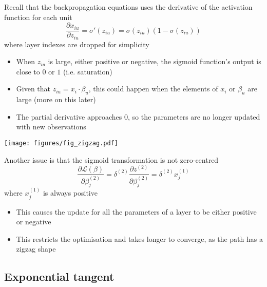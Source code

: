 \documentclass[c]{beamer}
\begin{document}
\begin{frame}{\secsubname}
	Recall that the backpropagation equations uses the derivative of the activation function for each unit
	\begin{equation*}
		\frac{\partial x_{iu}}{\partial z_{iu}} = \sigma'\left({z_{iu}}\right) = \sigma(z_{iu}) \left(1 - \sigma(z_{iu})\right)
	\end{equation*}
	where layer indexes are dropped for simplicity
	\begin{itemize}
		\item When $z_{iu}$ is large, either positive or negative, the sigmoid function's output is close to $0$ or $1$ (i.e. saturation)
		\item Given that $z_{iu} = x_i \cdot \beta_u$, this could happen when the elements of $x_i$ or $\beta_u$ are large (more on this later)
		\item The partial derivative approaches $0$, so the parameters are no longer updated with new observations
	\end{itemize}
\end{frame}

\begin{frame}{\secsubname}
	\begin{minipage}{.29\textwidth}
		\texttt{[image: figures/fig\_zigzag.pdf]}
	\end{minipage}
	\hfill
	\begin{minipage}{.69\textwidth}
		Another issue is that the sigmoid transformation is not zero-centred
		\begin{equation}
			\frac{\partial \mathcal{L}(\beta)}{\partial \beta^{(2)}_j} = \delta^{(2)} \frac{\partial z^{(2)}}{\partial \beta^{(2)}_j} = \delta^{(2)} x^{(1)}_j
		\end{equation}
		where $x^{(1)}_j$ is always positive
		\begin{itemize}
			\item This causes the update for all the parameters of a layer to be either positive or negative
			\item This restricts the optimisation and takes longer to converge, as the path has a zigzag shape
		\end{itemize}
	\end{minipage}
\end{frame}

\subsection{Exponential tangent}
\end{document}
